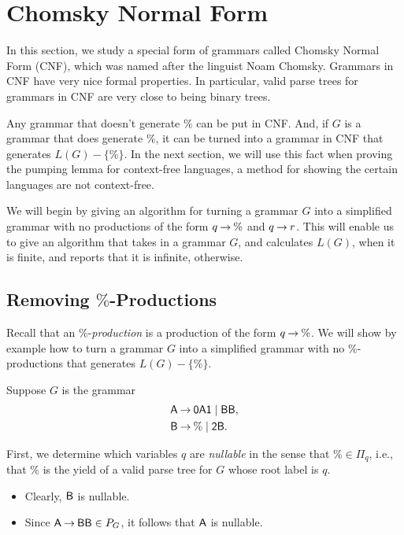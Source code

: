 \section{Chomsky Normal Form}
\label{ChomskyNormalForm}

In this section, we study a special form of grammars called Chomsky
Normal Form (CNF), which was named after the linguist Noam Chomsky.
Grammars in CNF have very nice formal properties.  In particular,
valid parse trees for grammars in CNF are very close to being binary
trees.

Any grammar that doesn't generate $\%$ can be put in CNF.  And, if $G$
is a grammar that does generate $\%$, it can be turned into a grammar
in CNF that generates $L(G)-\{\%\}$.  In the next section, we will use
this fact when proving the pumping lemma for context-free languages, a
method for showing the certain languages are not context-free.

We will begin by giving an algorithm for turning a grammar $G$ into a
simplified grammar with no productions of the form $q\mathbin{\to}\%$ and
$q\mathbin{\to} r$. This will enable us to give an algorithm that takes in a
grammar $G$, and calculates $L(G)$, when it is finite, and reports
that it is infinite, otherwise.

\subsection{Removing $\%$-Productions}

Recall that an $\%$-\emph{production} is a production of the form
$q\mathbin{\to}\%$.  We will show by example how to turn a grammar $G$ into a
simplified grammar with no $\%$-productions that generates
$L(G)-\{\%\}$.

Suppose $G$ is the grammar
\begin{align*}
\mathsf{A} &\mathbin{\to} \mathsf{0A1} \mid \mathsf{BB} , \\
\mathsf{B} &\mathbin{\to} \% \mid \mathsf{2B} .
\end{align*}

First, we determine which variables $q$ are \emph{nullable} in the
sense that $\%\in\Pi_q$, i.e., that $\%$ is the yield of a valid parse
tree for $G$ whose root label is $q$.
\begin{itemize}
\item Clearly, $\mathsf{B}$ is nullable.

\item Since $\mathsf{A}\mathbin{\to}\mathsf{B}\mathsf{B}\in P_G$, it follows that $\mathsf{A}$ is
  nullable.
\end{itemize}

